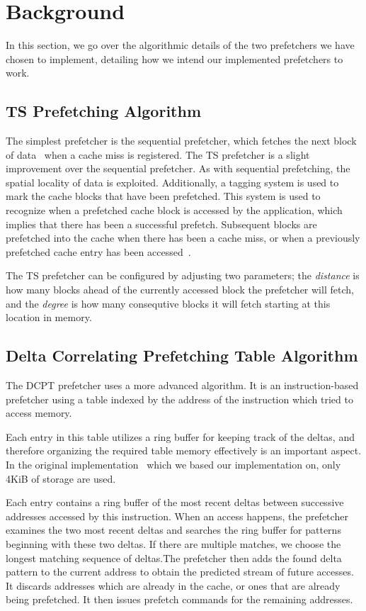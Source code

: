 \section{Background}

In this section, we go over the algorithmic details of the two prefetchers we
have chosen to implement, detailing how we intend our implemented prefetchers
to work.

\subsection{TS Prefetching Algorithm}

The simplest prefetcher is the sequential prefetcher, which fetches the next
block of data~\cite{seq} when a cache miss is registered. The TS prefetcher is a slight improvement over the
sequential prefetcher. As with sequential prefetching, the spatial locality of
data is exploited. Additionally, a tagging system is used to mark the cache blocks that have been
prefetched. This system is used to recognize when a prefetched cache block is
accessed by the application, which implies that there has been a successful
prefetch. Subsequent blocks are prefetched into the cache when there has been a
cache miss, or when a previously prefetched cache entry has been
accessed~\cite{grannaes}.

The TS prefetcher can be configured by adjusting two parameters; the
\emph{distance} is how many blocks ahead of the currently accessed block the
prefetcher will fetch, and the \emph{degree} is how many consequtive blocks it
will fetch starting at this location in memory.

\subsection{Delta Correlating Prefetching Table Algorithm}

The DCPT prefetcher uses a more advanced algorithm. It is an instruction-based
prefetcher using a table indexed by the address of the instruction which tried
to access memory.

Each entry in this table utilizes a ring buffer for keeping track of the deltas,
and therefore organizing the required table memory effectively is an important
aspect. In the original implementation~\cite{dcpt} which we based our
implementation on, only 4KiB of storage are used.

Each entry contains a ring buffer of the most recent deltas between successive
addresses accessed by this instruction. When an access happens, the prefetcher examines the two most recent deltas and searches the ring buffer for patterns beginning with these two deltas. If there are multiple matches, we choose the longest matching sequence of deltas.The prefetcher then adds the found delta pattern to the current address to
obtain the predicted stream of future accesses. It discards addresses which
are already in the cache, or ones that are already being prefetched. It then
issues prefetch commands for the remaining addresses.
